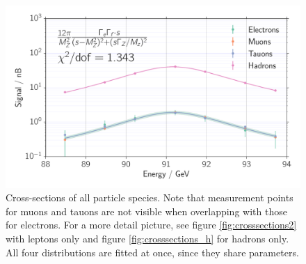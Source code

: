 \begin{figure}[htpb]
    \centering
    \includegraphics[width=1.0\linewidth]{figures/crosssections}
    \caption{Cross-sections of all particle species. Note that measurement points for 
        muons and tauons are not visible when overlapping with those for electrons. 
        For a more detail picture, see figure \ref{fig:crosssections2} with leptons only
    and figure \ref{fig:crosssections_h} for hadrons only. 
    All four distributions are fitted at once, since they share parameters. 
    }
    \label{fig:crosssections}
\end{figure}


